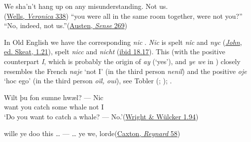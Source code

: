 \ea \label{ex:05-127}
\ea
We sha'n't hang up on any misunderstanding. Not us.\\\hfill(\href{https://archive.org/details/annveronicamoder0000hgwe/page/360/mode/2up?q=%22any+misunderstanding%22&view=theater}{Wells, \textit{Veronica} 338}) %
\ex ``you were all in the same room together, were not you?''\\``No, indeed, not us.''\hfill(\href{https://archive.org/details/sensesensibility00austrich/page/242/mode/2up?q=%22all+in+the+same+room%22&view=theater}{Austen, \textit{Sense} 269}) %
\z
\z{}

In Old English we have the corresponding \textit{nic} . \textit{Nic} is spelt \textit{nîc} and \textit{nyc} (\href{https://archive.org/details/holygospelsinan01skeagoog/page/n75/mode/2up?view=theater&q=nyc}{\textit{John}, ed. Skeat, 1.21}), spelt \textit{nicc} and \textit{nicht} (\href{https://archive.org/details/holygospelsinan01skeagoog/page/n365/mode/2up?view=theater&q=nicht}{ibid 18.17}). This (with the positive counterpart \textit{I}, which is probably the origin of \textit{ay} (`yes'), and \textit{ye we} in ) closely resembles the French \textit{naje} `not I' (in the third person \textit{nenil}) and the positive \textit{oje} `hoc ego' (in the third person \textit{oïl, oui}), see Tobler (\citeyear[\href{https://www.jstor.org/stable/pdf/40845615.pdf}{423}]{tobler1877franzosische}; \citeyear[\href{https://archive.org/details/vermischtebeitr04toblgoog/page/n17/mode/2up?view=theater}{1}]{tobler1886vermischte}); \citet[\href{https://www.jstor.org/stable/45042774?seq=3}{465}]{paris1878periodiques}.

\ea \label{ex:05-129}
\gll Wilt þu fon sumne hwæl? --- Nic\\
 want you catch some whale {} not I\\
\glt `Do you want to catch a whale? --- No.'\hfill(\href{https://archive.org/details/anglosaxonoldeng01wriguoft/page/51/mode/2up?view=theater&q=%22wilt%22}{Wright \& Wülcker 1.94})
\z{}

\ea \label{ex:05-130}
wille ye doo this {\dots} --- {\dots} ye we, lorde\hfill(\href{https://archive.org/details/TheHistoryOfReynardTheFoxArber/page/n87/mode/2up?q=%22wille+ye+doo+this%22&view=theater}{Caxton, \textit{Reynard} 58})
\z
{}
